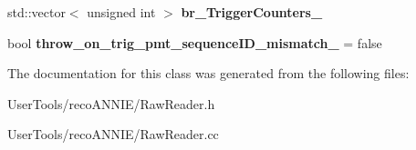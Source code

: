 \begin{DoxyCompactItemize}
\item 
\hypertarget{classannie_1_1RawReader_a2e9081d4b61053fbc3dffb3b51c7ab6e}{
std::vector$<$ unsigned int $>$ {\bfseries br\_\-TriggerCounters\_\-}}
\label{classannie_1_1RawReader_a2e9081d4b61053fbc3dffb3b51c7ab6e}

\item 
\hypertarget{classannie_1_1RawReader_a4854cab5500972fd0136b3f971b58cb3}{
bool {\bfseries throw\_\-on\_\-trig\_\-pmt\_\-sequenceID\_\-mismatch\_\-} = false}
\label{classannie_1_1RawReader_a4854cab5500972fd0136b3f971b58cb3}

\end{DoxyCompactItemize}


The documentation for this class was generated from the following files:\begin{DoxyCompactItemize}
\item 
UserTools/recoANNIE/RawReader.h\item 
UserTools/recoANNIE/RawReader.cc\end{DoxyCompactItemize}
